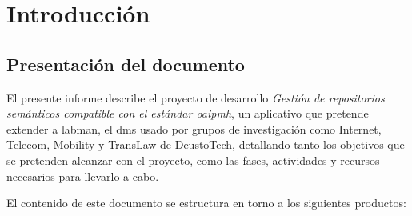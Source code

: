 \chapter{Introducción}\label{cha:introduccion}

\section{Presentación del documento}

El presente informe describe el proyecto de desarrollo \emph{Gestión de repositorios semánticos compatible con el estándar \acrfull{oaipmh}}, un aplicativo que pretende extender a \acrfull{labman}, el \acrshort{dms} usado por grupos de investigación como Internet, Telecom, Mobility y TransLaw de DeustoTech, detallando tanto los objetivos que se pretenden alcanzar con el proyecto, como las fases, actividades y recursos necesarios para llevarlo a cabo.

El contenido de este documento se estructura en torno a los siguientes productos:

